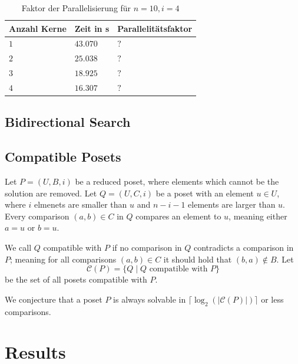 \documentclass[10pt,journal,compsoc]{IEEEtran}
\begin{document}
\begin{table}
  \begin{tabular}{l|l|l}
    Anzahl Kerne & Zeit in s & Parallelitätsfaktor \\
    \hline
    $1$          & $43.070$  & $?$                 \\ %
    $2$          & $25.038$  & $?$                 \\
    $3$          & $18.925$  & $?$                 \\
    $4$          & $16.307$  & $?$                 \\
  \end{tabular}
  \centering
  \caption{Faktor der Parallelisierung für $n = 10, i = 4$}
  \label{table:backward-parallel}
\end{table}


\subsection{Bidirectional Search}

\subsection{Compatible Posets}

Let $P = (U, B, i)$ be a reduced poset, where elements which cannot be the solution are removed.
Let $Q = (U, C, i)$ be a poset with an element $u \in U$, where $i$ elmenets are smaller than $u$ and $n-i-1$ elements are larger than $u$.
Every comparison $(a,b) \in C$ in $Q$ compares an element to $u$, meaning either $a = u$ or $b = u$.

We call $Q$ compatible with $P$ if no comparison in $Q$ contradicts a comparison in $P$; meaning for all comparisons $(a,b) \in C$ it should hold that $(b,a) \not\in B$.
Let $$\mathcal{C}(P) = \{Q \mid Q \text{ compatible with } P\}$$ be the set of all posets compatible with $P$.

We conjecture that a poset $P$ is always solvable in $\lceil\log_2(|\mathcal{C}(P)|)\rceil$ or less comparisons.

\section{Results}
\end{document}
